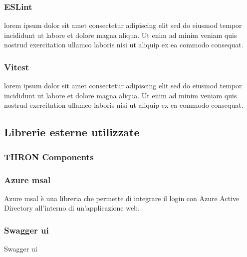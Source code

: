 \subsubsection{ESLint}\label{subsubsec:eslint}
lorem ipsum dolor sit amet consectetur adipiscing elit sed do eiusmod tempor incididunt ut labore et dolore magna aliqua. Ut enim ad minim veniam quis nostrud exercitation ullamco laboris nisi ut aliquip ex ea commodo consequat.
\subsubsection{Vitest}\label{subsubsec:vitest}
lorem ipsum dolor sit amet consectetur adipiscing elit sed do eiusmod tempor incididunt ut labore et dolore magna aliqua. Ut enim ad minim veniam quis nostrud exercitation ullamco laboris nisi ut aliquip ex ea commodo consequat.

\subsection{Librerie esterne utilizzate}\label{subsec:librerie-esterne}
\subsubsection{THRON Components}\label{subsubsec:thron-components}
\subsubsection{Azure msal}\label{subsubsec:azure-msal}
Azure msal è una libreria che permette di integrare il login con Azure Active Directory all'interno di un'applicazione web.
\subsubsection{Swagger ui}\label{subsubsec:swagger-ui}
Swagger ui 


